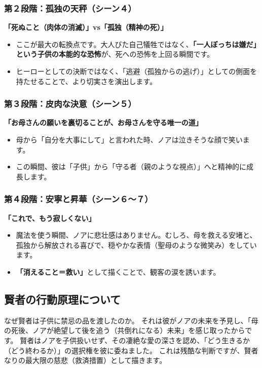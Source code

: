 \subsubsection{第２段階：孤独の天秤（シーン４）}
\textbf{「死ぬこと（肉体の消滅）」vs「孤独（精神の死）」}
\begin{itemize}
    \item ここが最大の転換点です。大人びた自己犠牲ではなく、\textbf{「一人ぼっちは嫌だ」という子供の本能的な恐怖}が、死への恐怖を上回る瞬間です。
    \item ヒーローとしての決断ではなく、「逃避（孤独からの逃げ）」としての側面を持たせることで、より切実さを演出します。
\end{itemize}

\subsubsection{第３段階：皮肉な決意（シーン５）}
\textbf{「お母さんの願いを裏切ることが、お母さんを守る唯一の道」}
\begin{itemize}
    \item 母から「自分を大事にして」と言われた時、ノアは泣きそうな顔で笑います。
    \item この瞬間、彼は「子供」から「守る者（親のような視点）」へと精神的に成長します。
\end{itemize}

\subsubsection{第４段階：安寧と昇華（シーン６〜７）}
\textbf{「これで、もう寂しくない」}
\begin{itemize}
    \item 魔法を使う瞬間、ノアに悲壮感はありません。むしろ、母を救える安堵と、孤独から解放される喜びで、穏やかな表情（聖母のような微笑み）をしています。
    \item \textbf{「消えること＝救い」}として描くことで、観客の涙を誘います。
\end{itemize}

\subsection{賢者の行動原理について} 
なぜ賢者は子供に禁忌の品を渡したのか。
それは彼がノアの未来を予見し、「母の死後、ノアが絶望して後を追う（共倒れになる）未来」を感じ取ったからです。
賢者はノアを子供扱いせず、その凄絶な愛の深さを認め、「どう生きるか（どう終わるか）」の選択権を彼に委ねました。
これは残酷な判断ですが、賢者なりの最大限の慈悲（救済措置）として描きます。

